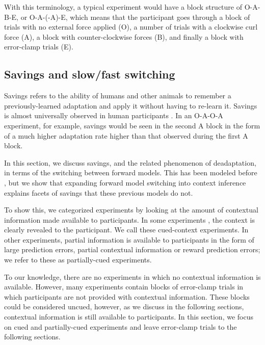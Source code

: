 \documentclass[a4paper,doc,floatsintext,natbib]{apa6}
\begin{document}
With this terminology, a typical experiment \cite[e.g.][]{Ethier_Spontaneous_2008} would have a block structure of O-A-B-E, or O-A-(-A)-E, which means that the participant goes through a block of trials with no external force applied (O), a number of trials with a clockwise curl force (A), a block with counter-clockwise forces (B), and finally a block with error-clamp trials (E).

\subsection{Savings and slow/fast switching}
Savings refers to the ability of humans and other animals to remember a previously-learned adaptation and apply it without having to re-learn it. Savings is almost universally observed in human participants \cite{Brashers-Krug_Consolidation_1996,Shadmehr_Functional_1997,Medina_Mechanism_2001,Smith_Interacting_2006,Zarahn_Explaining_2008}. In an O-A-O-A experiment, for example, savings would be seen in the second A block in the form of a much higher adaptation rate higher than that observed during the first A block.

In this section, we discuss savings, and the related phenomenon of deadaptation, in terms of the switching between forward models. This has been modeled before \citep[e.g.][]{Wolpert_Multiple_1998,Oh_Minimizing_2019}, but we show that expanding forward model switching into context inference explains facets of savings that these previous models do not.

To show this, we categorized experiments by looking at the amount of contextual information made available to participants. In some experiments \citep[e.g.][]{Kim_Neural_2015,Lee_Dual_2009}, the context is clearly revealed to the participant. We call these cued-context experiments. In other experiments, partial information is available to participants \citep[e.g.][]{Davidson_Scaling_2004,Zarahn_Explaining_2008} in the form of large prediction errors, partial contextual information or reward prediction errors; we refer to these as partially-cued experiments.

To our knowledge, there are no experiments in which no contextual information is available. However, many experiments \citep[e.g.][]{Huang_Persistence_2009,Brennan_Decay_2015,Smith_Interacting_2006} contain blocks of error-clamp trials in which participants are not provided with contextual information. These blocks could be considered uncued, however, as we discuss in the following sections, contextual information is still available to participants. In this section, we focus on cued and partially-cued experiments and leave error-clamp trials to the following sections.
\end{document}

